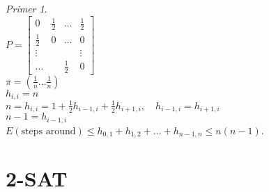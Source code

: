 \documentclass[a4paper, 12pt]{book}
\theoremstyle{definition}
\theoremstyle{remark}
\newtheorem*{ex}{Primer}
\begin{document}

\begin{ex} \text{} \\
  $P = \begin{bmatrix}
    0 & \frac{1}{2} & \dots & \frac{1}{2} \\
    \frac{1}{2} & 0 & \dots & 0 \\
    \vdots & & & \vdots \\
    \dots & & \frac{1}{2} & 0
  \end{bmatrix}$ \\
  $\pi = (\frac{1}{n} \dots \frac{1}{n})$ \\
  $h_{i,i} = n$ \\
  $n = h_{i,i} = 1 + \frac{1}{2} h_{i-1,i} + \frac{1}{2} h_{i+1,i}, \quad h_{i-1,i} = h_{i+1,i}$ \\
  $n-1 = h_{i-1,i}$ \\
  $E(\text{steps around}) \leq h_{0,1} + h_{1,2} + \dots + h_{n-1,n} \leq n(n-1)$.
\end{ex}


\section{2-SAT}
\end{document}

